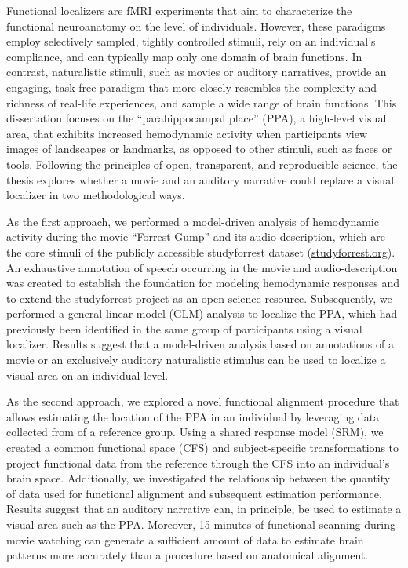
Functional localizers are fMRI experiments that aim to characterize the
functional neuroanatomy on the level of individuals.
%
However, these paradigms employ selectively sampled, tightly controlled
stimuli, rely on an individual's compliance, and can typically map only one
domain of brain functions.
In contrast, naturalistic stimuli, such as movies or auditory narratives,
provide an engaging, task-free paradigm that more closely resembles the
complexity and richness of real-life experiences, and sample a wide range of
brain functions.
This dissertation focuses on the ``parahippocampal place'' (PPA), a high-level
visual area, that exhibits increased hemodynamic activity when participants view
images of landscapes or landmarks, as opposed to other stimuli, such as faces
or tools.
Following the principles of open, transparent, and reproducible science, the
thesis explores whether a movie and an auditory narrative could replace a
visual localizer in two methodological ways.

As the first approach, we performed a model-driven analysis of hemodynamic
activity during the movie ``Forrest Gump'' and its audio-description, which are
the core stimuli of the publicly accessible studyforrest dataset
(\href{www.studyforrest.org}{\url{studyforrest.org}}).
%
An exhaustive annotation of speech occurring in the movie and audio-description
was created to establish the foundation for modeling hemodynamic responses and
to extend the studyforrest project as an open science resource.
Subsequently, we performed a general linear model (GLM) analysis to localize
the PPA, which had previously been identified in the same group of participants
using a visual localizer.
Results suggest that a model-driven analysis based on annotations of a movie or
an exclusively auditory naturalistic stimulus can be used to localize a visual
area on an individual level.

As the second approach, we explored a novel functional alignment procedure that
allows estimating the location of the PPA in an individual by leveraging data
collected from of a reference group.
%
Using a shared response model (SRM), we created a common functional space (CFS)
and subject-specific transformations to project functional data from the
reference through the CFS into an individual's brain space.
%
Additionally, we investigated the relationship between the quantity of data
used for functional alignment and subsequent estimation performance.
%
Results suggest that an auditory narrative can, in principle, be used to
estimate a visual area such as the PPA.
%
Moreover, 15 minutes of functional scanning during movie watching can generate
a sufficient amount of data to estimate brain patterns more accurately than a
procedure based on anatomical alignment.


